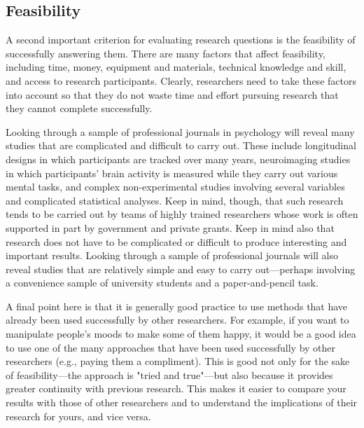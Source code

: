 \subsection{Feasibility}
A second important criterion for evaluating research questions is the feasibility of successfully answering them. There are many factors that affect feasibility, including time, money, equipment and materials, technical knowledge and skill, and access to research participants. Clearly, researchers need to take these factors into account so that they do not waste time and effort pursuing research that they cannot complete successfully.

Looking through a sample of professional journals in psychology will reveal many studies that are complicated and difficult to carry out. These include longitudinal designs in which participants are tracked over many years, neuroimaging studies in which participants' brain activity is measured while they carry out various mental tasks, and complex non-experimental studies involving several variables and complicated statistical analyses. Keep in mind, though, that such research tends to be carried out by teams of highly trained researchers whose work is often supported in part by government and private grants. Keep in mind also that research does not have to be complicated or difficult to produce interesting and important results. Looking through a sample of professional journals will also reveal studies that are relatively simple and easy to carry out---perhaps involving a convenience sample of university students and a paper-and-pencil task.

A final point here is that it is generally good practice to use methods that have already been used successfully by other researchers. For example, if you want to manipulate people's moods to make some of them happy, it would be a good idea to use one of the many approaches that have been used successfully by other researchers (e.g., paying them a compliment). This is good not only for the sake of feasibility---the approach is "tried and true"---but also because it provides greater continuity with previous research. This makes it easier to compare your results with those of other researchers and to understand the implications of their research for yours, and vice versa.

